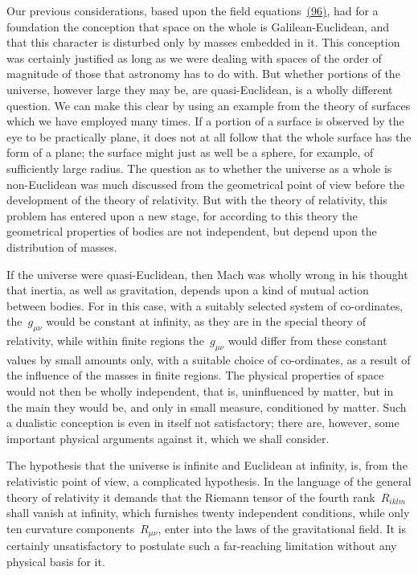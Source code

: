 \documentclass[12pt]{book}[2005/09/16]
\newcommand{\PageSep}[1]{\ignorespaces}
\newcommand{\Eqref}[1]{\hyperref[eqn:#1]{#1}}
\begin{document}
Our previous considerations, based upon the field
equations~\Eqref{(96)}, had for a foundation the conception that
space on the whole is Galilean-Euclidean, and that this
character is disturbed only by masses embedded in it.
This conception was certainly justified as long as we were
dealing with spaces of the order of magnitude of those
\PageSep{109}
that astronomy has to do with. But whether portions of
the universe, however large they may be, are quasi-Euclidean,
is a wholly different question. We can make
this clear by using an example from the theory of surfaces
which we have employed many times. If a portion of a
surface is observed by the eye to be practically plane, it
does not at all follow that the whole surface has the form
of a plane; the surface might just as well be a sphere, for
example, of sufficiently large radius. The question as to
whether the universe as a whole is non-Euclidean was
much discussed from the geometrical point of view before
the development of the theory of relativity. But with the
theory of relativity, this problem has entered upon a
new stage, for according to this theory the geometrical
properties of bodies are not independent, but depend
upon the distribution of masses.

If the universe were quasi-Euclidean, then Mach was
%
wholly wrong in his thought that inertia, as well as
gravitation, depends upon a kind of mutual action between
bodies. For in this case, with a suitably selected system
of co-ordinates, the~$g_{\mu\nu}$ would be constant at infinity, as
they are in the special theory of relativity, while within
finite regions the~$g_{\mu\nu}$ would differ from these constant
values by small amounts only, with a suitable choice of
co-ordinates, as a result of the influence of the masses in
finite regions. The physical properties of space would
not then be wholly independent, that is, uninfluenced by
matter, but in the main they would be, and only in
small measure, conditioned by matter. Such a dualistic
conception is even in itself not satisfactory; there are,
\PageSep{110}
however, some important physical arguments against it,
which we shall consider.

The hypothesis that the universe is infinite and
%
%
Euclidean at infinity, is, from the relativistic point of
view, a complicated hypothesis. In the language of the
general theory of relativity it demands that the Riemann
%
tensor of the fourth rank~$R_{iklm}$ shall vanish at infinity,
which furnishes twenty independent conditions, while only
ten curvature components~$R_{\mu\nu}$, enter into the laws of the
gravitational field. It is certainly unsatisfactory to
postulate such a far-reaching limitation without any
physical basis for it.
\end{document}
